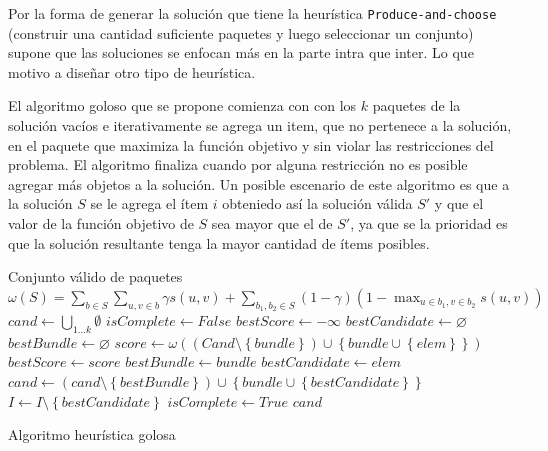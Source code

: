 Por la forma de generar la solución que tiene la heurística \texttt{Produce-and-choose} (construir una cantidad suficiente paquetes y luego seleccionar un conjunto) supone que las soluciones se enfocan más en la parte intra que inter. Lo que motivo a diseñar otro tipo de heurística.

El algoritmo goloso que se propone comienza con con los $k$ paquetes de la solución vacíos e iterativamente se agrega un item, que no pertenece a la solución, en el paquete que maximiza la función objetivo y sin violar las restricciones del problema. El algoritmo finaliza cuando por alguna restricción no es posible agregar más objetos a la solución. Un posible escenario de este algoritmo es que a la solución $S$ se le agrega el ítem $i$ obteniedo así la solución válida $S'$ y que el valor de la función objetivo de $S$ sea mayor que el de $S'$, ya que se la prioridad es que la solución resultante tenga la mayor cantidad de ítems posibles.

\begin{algorithm}[H]
\begin{algorithmic}[1]
\ENSURE Conjunto válido de paquetes
\STATE $\omega(S) = \sum_{b \in S}{\sum_{u,v \in b}{\gamma s(u,v)}} + \sum_{b_1,b_2 \in S}{(1-\gamma) (1-\max_{u \in b_1, v \in b_2}{s(u,v)})}$
\STATE $cand \leftarrow \bigcup_{1 \ldots k}\emptyset$
\STATE $isComplete \leftarrow False$
  \STATE $bestScore \leftarrow -\infty$
  \STATE $bestCandidate \leftarrow \varnothing$
  \STATE $bestBundle \leftarrow \varnothing$
        \STATE $score \leftarrow \omega((Cand \setminus \left\{bundle\right\}) \cup \left\{bundle \cup \left\{elem\right\}\right\})$
          \STATE $bestScore \leftarrow score$
          \STATE $bestBundle \leftarrow bundle$
          \STATE $bestCandidate \leftarrow elem$
        \ENDIF
      \ENDIF
    \ENDFOR
  \ENDFOR
		\STATE $cand \leftarrow (cand \setminus \left\{bestBundle\right\}) \cup \left\{bundle \cup \left\{bestCandidate\right\}\right\}$
		\STATE $I \leftarrow I \setminus \left\{bestCandidate\right\}$
	\ELSE
		\STATE $isComplete \leftarrow True$
	\ENDIF
\ENDWHILE
\RETURN $cand$
\end{algorithmic}
\caption{Algoritmo heurística golosa}\label{alg:algHeuGol}
\end{algorithm}

